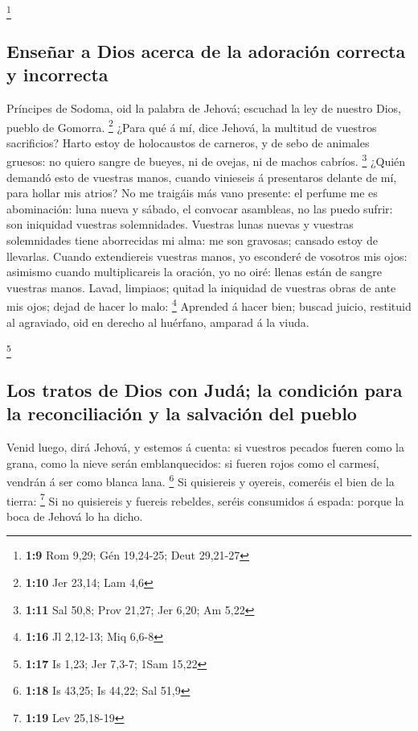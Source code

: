 \footnote{\textbf{1:9} Rom 9,29; Gén 19,24-25; Deut 29,21-27}

\hypertarget{enseuxf1ar-a-dios-acerca-de-la-adoraciuxf3n-correcta-y-incorrecta}{%
\subsection{Enseñar a Dios acerca de la adoración correcta y
incorrecta}\label{enseuxf1ar-a-dios-acerca-de-la-adoraciuxf3n-correcta-y-incorrecta}}

 Príncipes de Sodoma, oid la palabra de Jehová; escuchad
la ley de nuestro Dios, pueblo de Gomorra. \footnote{\textbf{1:10} Jer
  23,14; Lam 4,6}  ¿Para qué á mí, dice Jehová, la
multitud de vuestros sacrificios? Harto estoy de holocaustos de
carneros, y de sebo de animales gruesos: no quiero sangre de bueyes, ni
de ovejas, ni de machos cabríos. \footnote{\textbf{1:11} Sal 50,8; Prov
  21,27; Jer 6,20; Am 5,22}  ¿Quién demandó esto de
vuestras manos, cuando vinieseis á presentaros delante de mí, para
hollar mis atrios?  No me traigáis más vano presente: el
perfume me es abominación: luna nueva y sábado, el convocar asambleas,
no las puedo sufrir: son iniquidad vuestras solemnidades.
 Vuestras lunas nuevas y vuestras solemnidades tiene
aborrecidas mi alma: me son gravosas; cansado estoy de llevarlas.
 Cuando extendiereis vuestras manos, yo esconderé de
vosotros mis ojos: asimismo cuando multiplicareis la oración, yo no
oiré: llenas están de sangre vuestras manos.  Lavad,
limpiaos; quitad la iniquidad de vuestras obras de ante mis ojos; dejad
de hacer lo malo: \footnote{\textbf{1:16} Jl 2,12-13; Miq 6,6-8}
 Aprended á hacer bien; buscad juicio, restituid al
agraviado, oid en derecho al huérfano, amparad á la viuda.

\footnote{\textbf{1:17} Is 1,23; Jer 7,3-7; 1Sam 15,22}

\hypertarget{los-tratos-de-dios-con-juduxe1-la-condiciuxf3n-para-la-reconciliaciuxf3n-y-la-salvaciuxf3n-del-pueblo}{%
\subsection{Los tratos de Dios con Judá; la condición para la
reconciliación y la salvación del
pueblo}\label{los-tratos-de-dios-con-juduxe1-la-condiciuxf3n-para-la-reconciliaciuxf3n-y-la-salvaciuxf3n-del-pueblo}}

 Venid luego, dirá Jehová, y estemos á cuenta: si
vuestros pecados fueren como la grana, como la nieve serán
emblanquecidos: si fueren rojos como el carmesí, vendrán á ser como
blanca lana. \footnote{\textbf{1:18} Is 43,25; Is 44,22; Sal 51,9}
 Si quisiereis y oyereis, comeréis el bien de la tierra:
\footnote{\textbf{1:19} Lev 25,18-19}  Si no quisiereis y
fuereis rebeldes, seréis consumidos á espada: porque la boca de Jehová
lo ha dicho.

